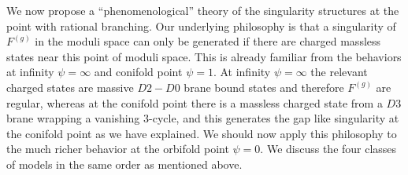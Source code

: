 \documentclass[12pt]{article}
\begin{document}
We now propose a ``phenomenological'' theory of the singularity
structures at the point with rational branching. Our underlying philosophy is
that a singularity of $F^{(g)}$ in the moduli space can only be
generated if there are charged massless states near this point of
moduli space. This is already familiar from the behaviors at
infinity $\psi=\infty$ and conifold point $\psi=1$. At infinity
$\psi=\infty$ the relevant charged states are massive $D2-D0$
brane bound states and therefore $F^{(g)}$ are regular, whereas at
the conifold point there is a massless charged state from a $D3$
brane wrapping a vanishing 3-cycle, and this generates the gap
like singularity at the conifold point as we have explained. We
should now apply this philosophy to the much richer behavior at
the orbifold point $\psi=0$. We discuss the four classes of models
in the same order as mentioned above.
\end{document}
